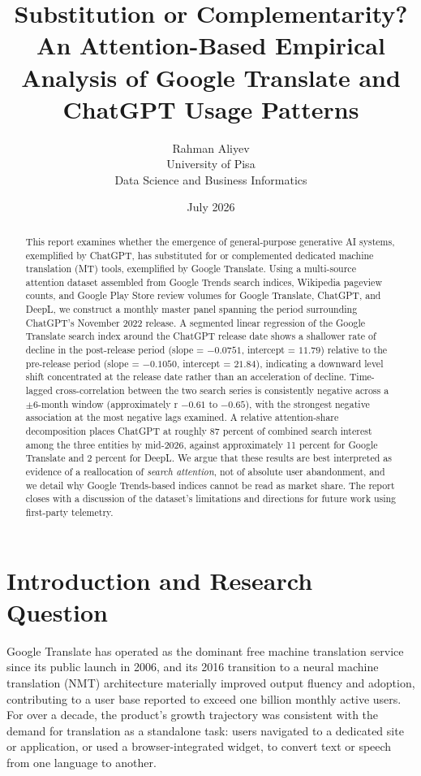 \documentclass[11pt]{article}
\title{Substitution or Complementarity? An Attention-Based Empirical Analysis of Google Translate and ChatGPT Usage Patterns}
\author{Rahman Aliyev\\ University of Pisa\\ Data Science and Business Informatics}
\date{July 2026}
\begin{document}
\maketitle

\begin{abstract}
This report examines whether the emergence of general-purpose generative AI systems, 
exemplified by ChatGPT, has substituted for or complemented dedicated machine translation (MT) tools, exemplified by Google Translate. Using a multi-source attention dataset assembled from Google Trends search indices, Wikipedia pageview counts, and Google Play Store review volumes for Google Translate, ChatGPT, and DeepL, we construct a monthly master panel spanning the period surrounding ChatGPT's November 2022 release. A segmented linear regression of the Google Translate search index around the ChatGPT release date shows a shallower rate of decline in the post-release period (slope = $-0.0751$, intercept = $11.79$) relative to the pre-release period (slope = $-0.1050$, intercept = $21.84$), indicating a downward level shift concentrated at the release date rather than an acceleration of decline. Time-lagged cross-correlation between the two search series is consistently negative across a $\pm 6$-month window (approximately r $-0.61$ to $-0.65$), with the strongest negative association at the 
most negative lags examined. A relative attention-share decomposition places ChatGPT at roughly 
87 percent of combined search interest among the three entities by mid-2026, against approximately 11 percent for Google Translate and 2 percent for DeepL. We argue that these results are best interpreted as evidence of a reallocation of \emph{search attention}, not of absolute user abandonment, and we detail why Google Trends-based indices cannot be read as market share. The report closes with a discussion of the dataset's limitations and 
directions for future work using first-party telemetry. \end{abstract}

\section{Introduction and Research Question}

Google Translate has operated as the dominant free machine translation service since its public launch in 2006, and its 2016 transition to a neural machine translation (NMT) architecture materially improved output fluency and adoption, contributing to a user base reported to exceed one billion monthly active users. For over a decade, the product's growth trajectory was consistent with the demand for translation as a standalone task: users navigated to a dedicated site or application, or used a browser-integrated widget, to convert text or speech from one language to another.
\end{document}
